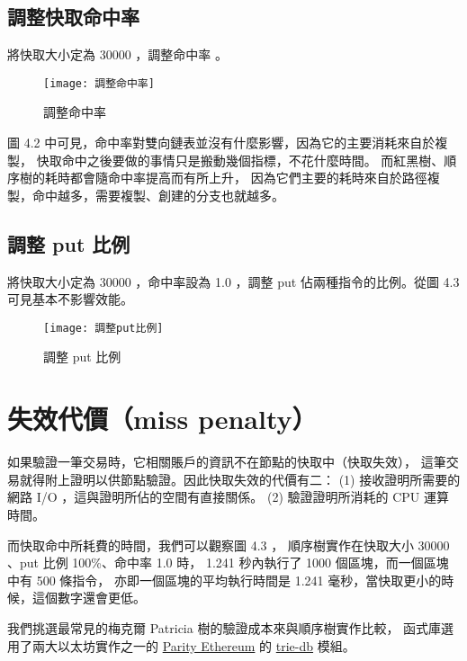 \subsection{調整快取命中率}

將快取大小定為 30000 ，調整命中率 。

\begin{figure}[h!]
\texttt{[image: 調整命中率]}
\caption{調整命中率}
\end{figure}

圖 4.2 中可見，命中率對雙向鏈表並沒有什麼影響，因為它的主要消耗來自於複製，
快取命中之後要做的事情只是搬動幾個指標，不花什麼時間。
而紅黑樹、順序樹的耗時都會隨命中率提高而有所上升，
因為它們主要的耗時來自於路徑複製，命中越多，需要複製、創建的分支也就越多。

\subsection{調整 put 比例}

將快取大小定為 30000 ，命中率設為 1.0 ，調整 put 佔兩種指令的比例。從圖 4.3 可見基本不影響效能。

\begin{figure}[h!]
\texttt{[image: 調整put比例]}
\caption{調整 put 比例}
\end{figure}


\section{失效代價（miss penalty）}

如果驗證一筆交易時，它相關賬戶的資訊不在節點的快取中（快取失效），
這筆交易就得附上證明以供節點驗證。因此快取失效的代價有二：
(1) 接收證明所需要的網路 I/O ，這與證明所佔的空間有直接關係。
(2) 驗證證明所消耗的 CPU 運算時間。

而快取命中所耗費的時間，我們可以觀察圖 4.3 ，
順序樹實作在快取大小 30000 、put 比例 100\%、命中率 1.0 時，
 1.241 秒內執行了 1000 個區塊，而一個區塊中有 500 條指令，
亦即一個區塊的平均執行時間是 1.241 毫秒，當快取更小的時候，這個數字還會更低。

我們挑選最常見的梅克爾 Patricia 樹的驗證成本來與順序樹實作比較，
函式庫選用了兩大以太坊實作之一的 \href{https://www.parity.io/ethereum/}{Parity Ethereum}
的 \href{https://docs.rs/trie-db/0.20.1/trie_db/index.html}{trie-db} 模組。

